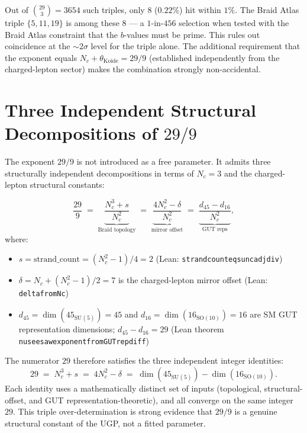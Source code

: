 \documentclass[12pt,a4paper]{article}
\theoremstyle{definition}
\theoremstyle{remark}
\newcommand{\lean}[1]{%
  \penalty-100
  \begingroup\def\_{\textunderscore\allowbreak}\texttt{#1}\endgroup}
\begin{document}
Out of $\binom{29}{3} = 3654$ such triples, only $8$ ($0.22\%$)
hit within $1\%$.
The Braid Atlas triple $\{5, 11, 19\}$ is among these 8 --- a
$1\text{-in-}456$ selection when tested with the Braid Atlas constraint
that the $b$-values must be prime.
This rules out coincidence at the $\sim 2\sigma$ level for the triple alone.
The additional requirement that the exponent equals
$N_c + \theta_{\mathrm{Koide}} = 29/9$ (established independently
from the charged-lepton sector) makes the combination strongly
non-accidental.

\section{Three Independent Structural Decompositions of $29/9$}
\label{sec:decomp}

The exponent $29/9$ is not introduced as a free parameter.
It admits three structurally independent decompositions in terms
of $N_c = 3$ and the charged-lepton structural constants:

\begin{equation}
\frac{29}{9}
\;=\;
\underbrace{\frac{N_c^3 + s}{N_c^2}}_{\text{Braid topology}}
\;=\;
\underbrace{\frac{4N_c^2 - \delta}{N_c^2}}_{\text{mirror offset}}
\;=\;
\underbrace{\frac{d_{45} - d_{16}}{N_c^2}}_{\text{GUT reps}},
\label{eq:three_decomp}
\end{equation}
where:
\begin{itemize}[leftmargin=1.3em,itemsep=0.15em]
  \item $s = \mathrm{strand\_count} = (N_c^2-1)/4 = 2$
    (Lean: \lean{strand\_count\_eq\_su\_nc\_adj\_div\_4})
  \item $\delta = N_c + (N_c^2-1)/2 = 7$ is the charged-lepton
    mirror offset (Lean: \lean{delta\_from\_N\_c})
  \item $d_{45} = \dim(45_{\mathrm{SU}(5)}) = 45$ and
    $d_{16} = \dim(16_{\mathrm{SO}(10)}) = 16$
    are SM GUT representation dimensions;
    $d_{45} - d_{16} = 29$
    (Lean theorem \lean{nu\_seesaw\_exponent\_from\_GUT\_rep\_diff})
\end{itemize}

The numerator $29$ therefore satisfies the three independent integer identities:
\begin{equation}
29 \;=\; N_c^3 + s \;=\; 4N_c^2 - \delta \;=\; \dim(45_{\mathrm{SU}(5)}) - \dim(16_{\mathrm{SO}(10)}).
\label{eq:29_identities}
\end{equation}
Each identity uses a mathematically distinct set of inputs
(topological, structural-offset, and GUT representation-theoretic),
and all converge on the same integer $29$.
This triple over-determination is strong evidence that
$29/9$ is a genuine structural constant of the UGP,
not a fitted parameter.
\end{document}

